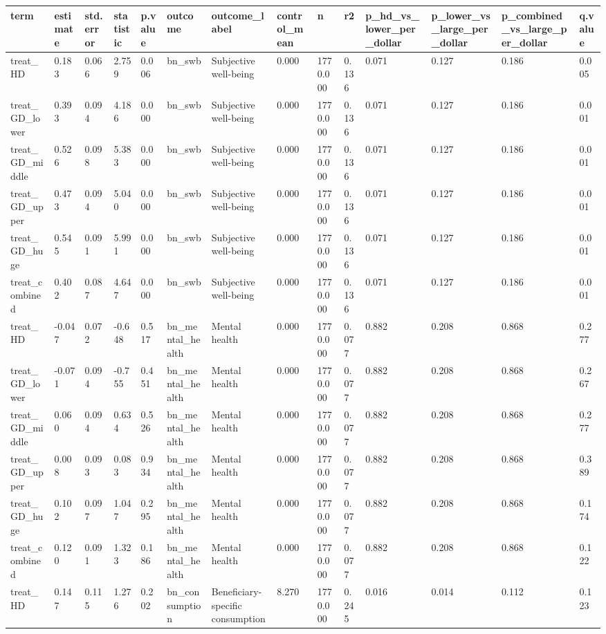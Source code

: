\begin{tabular}{llllllllllllll}
\toprule
term & estimate & std.error & statistic & p.value & outcome & outcome\_label & control\_mean & n & r2 & p\_hd\_vs\_lower\_per\_dollar & p\_lower\_vs\_large\_per\_dollar & p\_combined\_vs\_large\_per\_dollar & q.value
 \\
\midrule
treat\_HD & 0.183 & 0.066 & 2.759 & 0.006 & bn\_swb & Subjective well-being & 0.000 & 1770.000 & 0.136 & 0.071 & 0.127 & 0.186 & 0.005 \\
treat\_GD\_lower & 0.393 & 0.094 & 4.186 & 0.000 & bn\_swb & Subjective well-being & 0.000 & 1770.000 & 0.136 & 0.071 & 0.127 & 0.186 & 0.001 \\
treat\_GD\_middle & 0.526 & 0.098 & 5.383 & 0.000 & bn\_swb & Subjective well-being & 0.000 & 1770.000 & 0.136 & 0.071 & 0.127 & 0.186 & 0.001 \\
treat\_GD\_upper & 0.473 & 0.094 & 5.040 & 0.000 & bn\_swb & Subjective well-being & 0.000 & 1770.000 & 0.136 & 0.071 & 0.127 & 0.186 & 0.001 \\
treat\_GD\_huge & 0.545 & 0.091 & 5.991 & 0.000 & bn\_swb & Subjective well-being & 0.000 & 1770.000 & 0.136 & 0.071 & 0.127 & 0.186 & 0.001 \\
treat\_combined & 0.402 & 0.087 & 4.647 & 0.000 & bn\_swb & Subjective well-being & 0.000 & 1770.000 & 0.136 & 0.071 & 0.127 & 0.186 & 0.001 \\
treat\_HD & -0.047 & 0.072 & -0.648 & 0.517 & bn\_mental\_health & Mental health & 0.000 & 1770.000 & 0.077 & 0.882 & 0.208 & 0.868 & 0.277 \\
treat\_GD\_lower & -0.071 & 0.094 & -0.755 & 0.451 & bn\_mental\_health & Mental health & 0.000 & 1770.000 & 0.077 & 0.882 & 0.208 & 0.868 & 0.267 \\
treat\_GD\_middle & 0.060 & 0.094 & 0.634 & 0.526 & bn\_mental\_health & Mental health & 0.000 & 1770.000 & 0.077 & 0.882 & 0.208 & 0.868 & 0.277 \\
treat\_GD\_upper & 0.008 & 0.093 & 0.083 & 0.934 & bn\_mental\_health & Mental health & 0.000 & 1770.000 & 0.077 & 0.882 & 0.208 & 0.868 & 0.389 \\
treat\_GD\_huge & 0.102 & 0.097 & 1.047 & 0.295 & bn\_mental\_health & Mental health & 0.000 & 1770.000 & 0.077 & 0.882 & 0.208 & 0.868 & 0.174 \\
treat\_combined & 0.120 & 0.091 & 1.323 & 0.186 & bn\_mental\_health & Mental health & 0.000 & 1770.000 & 0.077 & 0.882 & 0.208 & 0.868 & 0.122 \\
treat\_HD & 0.147 & 0.115 & 1.276 & 0.202 & bn\_consumption & Beneficiary-specific consumption & 8.270 & 1770.000 & 0.245 & 0.016 & 0.014 & 0.112 & 0.123 \\

\end{tabular}
